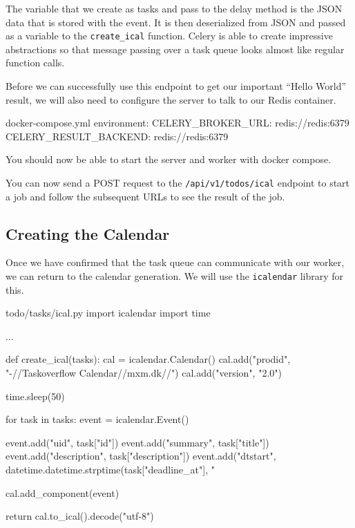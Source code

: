 \documentclass{csse4400}
\begin{document}
The variable that we create as tasks and pass to the delay method is the JSON data that is stored with the event.
It is then deserialized from JSON and passed as a variable to the \texttt{create\_ical} function.
Celery is able to create impressive abstractions so that message passing over a task queue looks almost like regular function calls.

Before we can successfully use this endpoint to get our important ``Hello World'' result,
we will also need to configure the server to talk to our Redis container.

\begin{code}[numbers=none]{docker-compose.yml}
  environment:
    CELERY_BROKER_URL: redis://redis:6379
    CELERY_RESULT_BACKEND: redis://redis:6379
\end{code}

You should now be able to start the server and worker with docker compose.


You can now send a POST request to the \texttt{/api/v1/todos/ical} endpoint to start a job and follow the subsequent URLs to see the result of the job.

\subsection{Creating the Calendar}

Once we have confirmed that the task queue can communicate with our worker,
we can return to the calendar generation.
We will use the \texttt{icalendar} library for this.


\begin{code}[language=python,numbers=none]{todo/tasks/ical.py}
import icalendar
import time

...

def create_ical(tasks):
    cal = icalendar.Calendar()
    cal.add("prodid", "-//Taskoverflow Calendar//mxm.dk//")
    cal.add("version", "2.0")

    time.sleep(50)

    for task in tasks:
        event = icalendar.Event()
        
        event.add("uid", task["id"])
        event.add("summary", task["title"])
        event.add("description", task["description"])
        event.add("dtstart", datetime.datetime.strptime(task["deadline_at"], "%

        cal.add_component(event)

    return cal.to_ical().decode("utf-8")
\end{code}
\end{document}
